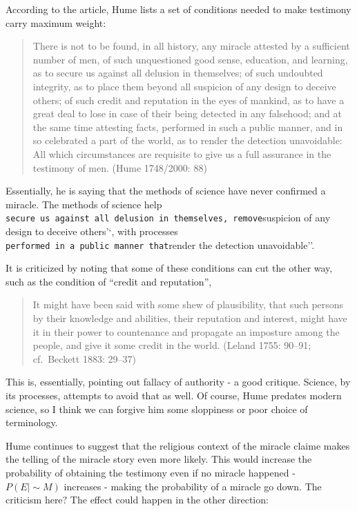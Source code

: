 \documentclass{tufte-book}
\begin{document}
According to the article, Hume lists a set of conditions needed to make
testimony carry maximum weight:

\begin{quote}
There is not to be found, in all history, any miracle attested by
a sufficient number of men, of such unquestioned good sense, education,
and learning, as to secure us against all delusion in themselves; of
such undoubted integrity, as to place them beyond all suspicion of any
design to deceive others; of such credit and reputation in the eyes of
mankind, as to have a great deal to lose in case of their being detected
in any falsehood; and at the same time attesting facts, performed in
such a public manner, and in so celebrated a part of the world, as to
render the detection unavoidable: All which circumstances are requisite
to give us a full assurance in the testimony of men. (Hume 1748/2000:
88)
\end{quote}

Essentially, he is saying that the methods of science have never
confirmed a miracle. The methods of science help
\texttt{secure\ us\ against\ all\ delusion\ in\ themselves\textquotesingle{}\textquotesingle{},\ remove}suspicion
of any design to deceive others'`, with processes
\texttt{performed\ in\ a\ public\ manner\textquotesingle{}\textquotesingle{}\ that}render
the detection unavoidable''.

It is criticized by noting that some of these conditions can cut the
other way, such as the condition of ``credit and reputation'',

\begin{quote}
It might have been said with some shew of plausibility, that such
persons by their knowledge and abilities, their reputation and interest,
might have it in their power to countenance and propagate an imposture
among the people, and give it some credit in the world. (Leland 1755:
90--91; cf.~Beckett 1883: 29--37)
\end{quote}

This is, essentially, pointing out fallacy of authority - a good
critique. Science, by its processes, attempts to avoid that as well. Of
course, Hume predates modern science, so I think we can forgive him some
sloppiness or poor choice of terminology.

Hume continues to suggest that the religious context of the miracle
claime makes the telling of the miracle story even more likely. This
would increase the probability of obtaining the testimony even if no
miracle happened - \(P(E|\sim\!M)\) increases - making the probability
of a miracle go down. The criticism here? The effect could happen in the
other direction:
\end{document}
